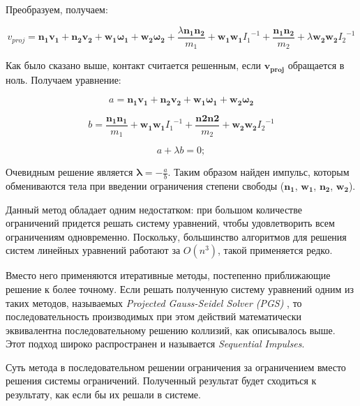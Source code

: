 Преобразуем, получаем:

\begin{equation} 
v_{proj} = \mathbf{n_1} \mathbf{v_1} + \mathbf{n_2} \mathbf{v_2}
         + \mathbf{w_1} \mathbf{\omega_{1}} + \mathbf{w_2} \mathbf{\omega_{2}}
         + \frac{\lambda \mathbf{n_1} \mathbf{n_2}}{m_1} + \mathbf{w_1} \mathbf{w_1} {I_1}^{-1} 
	 + \frac{\mathbf{n_1} \mathbf{n_2}}{m_2} + \lambda \mathbf{w_2} \mathbf{w_2} {I_2}^{-1} 
\end{equation}


Как было сказано выше, контакт считается решенным, если $\mathbf{v_{proj}}$ обращается в ноль. Получаем уравнение:

\begin{equation} 
  a = \mathbf{n_1} \mathbf{v_1} + \mathbf{n_2} \mathbf{v_2}
    + \mathbf{w_1} \mathbf{\omega_{1}}
    + \mathbf{w_2} \mathbf{\omega_{2}}
\end{equation}

\begin{equation} 
  b = \frac{\mathbf{n_1} \mathbf{n_1} }{m_1} 
    + \mathbf{w_1} \mathbf{w_1} {I_1}^{-1}
    + \frac{\mathbf{n2} \mathbf{n2} }{m_2} 
    + \mathbf{w_2} \mathbf{w_2} {I_{2}}^{-1}
\end{equation} 

\begin{equation} 
  a + \lambda b  = 0;
\end{equation} 

Очевидным решение является $\mathbf{\lambda} = -\frac{a}{b}$. Таким образом найден импульс, 
которым обмениваются тела при введении ограничения степени свободы ($\mathbf{n_1}$, $\mathbf{w_1}$, $\mathbf{n_2}$, $\mathbf{w_2}$). 


Данный метод обладает одним недостатком: при большом количестве ограничений придется решать систему уравнений, чтобы удовлетворить всем ограничениям
одновременно. Поскольку, большинство алгоритмов для решения систем линейных уравнений работают за $O(n^{3})$, такой применяется редко. 

Вместо него применяются итеративные методы, постепенно приближающие решение к более точному.
Если решать полученную систему уравнений одним из таких методов, называемых \textit{Projected Gauss-Seidel Solver (PGS) },
то последовательность производимых при этом действий математически эквивалентна последовательному решению коллизий, как описывалось выше.
Этот подход широко распространен и называется \textit{Sequential Impulses}.

Суть метода в последовательном решении ограничения за ограничением вместо решения системы ограничений.
Полученный результат будет сходиться к результату, как если бы их решали в системе.

